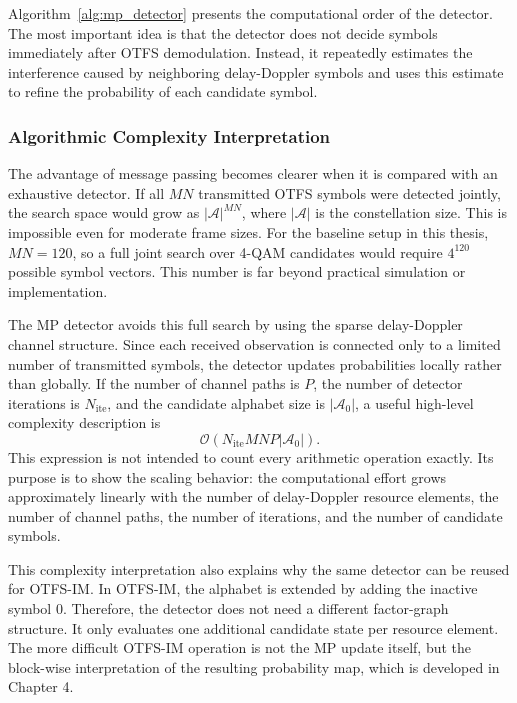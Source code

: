 Algorithm~\ref{alg:mp_detector} presents the computational order of the detector. The most important idea is that the detector does not decide symbols immediately after OTFS demodulation. Instead, it repeatedly estimates the interference caused by neighboring delay-Doppler symbols and uses this estimate to refine the probability of each candidate symbol.

\subsubsection{Algorithmic Complexity Interpretation}

The advantage of message passing becomes clearer when it is compared with an exhaustive detector. If all \(MN\) transmitted OTFS symbols were detected jointly, the search space would grow as \(|\mathcal{A}|^{MN}\), where \(|\mathcal{A}|\) is the constellation size. This is impossible even for moderate frame sizes. For the baseline setup in this thesis, \(MN=120\), so a full joint search over 4-QAM candidates would require \(4^{120}\) possible symbol vectors. This number is far beyond practical simulation or implementation.

The MP detector avoids this full search by using the sparse delay-Doppler channel structure. Since each received observation is connected only to a limited number of transmitted symbols, the detector updates probabilities locally rather than globally. If the number of channel paths is \(P\), the number of detector iterations is \(N_{\mathrm{ite}}\), and the candidate alphabet size is \(|\mathcal{A}_{0}|\), a useful high-level complexity description is
\begin{equation}
    \mathcal{O}
    \left(
    N_{\mathrm{ite}}
    MN
    P
    |\mathcal{A}_{0}|
    \right).
    \label{eq:mp_complexity_order}
\end{equation}
This expression is not intended to count every arithmetic operation exactly. Its purpose is to show the scaling behavior: the computational effort grows approximately linearly with the number of delay-Doppler resource elements, the number of channel paths, the number of iterations, and the number of candidate symbols.

This complexity interpretation also explains why the same detector can be reused for OTFS-IM. In OTFS-IM, the alphabet is extended by adding the inactive symbol \(0\). Therefore, the detector does not need a different factor-graph structure. It only evaluates one additional candidate state per resource element. The more difficult OTFS-IM operation is not the MP update itself, but the block-wise interpretation of the resulting probability map, which is developed in Chapter 4.

